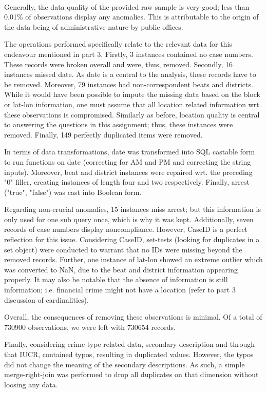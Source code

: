 \documentclass[a4paper]{article}
\begin{document}
\

Generally, the data quality of the provided  raw sample is very good; less than 0.01\% of observations display any anomalies. This is attributable to the origin of the data being of administrative nature by public offices.

\indent The operations performed specifically relate to the relevant data for this endeavour mentioned in part 3. Firstly, 3 instances contained no case numbers. These records were broken overall and were, thus, removed. Secondly, 16 instances missed date. As date is a central to the analysis, these records have to be removed. Moreover, 79 instances had non-correspondent beats and districts. While it would have been possible to impute the missing data based on the block or lat-lon information, one must assume that all location related information wrt. these observations is compromised. Similarly as before, location quality is central to answering the questions in this assignment; thus, these instances were removed. Finally, 149 perfectly duplicated items were removed. 

\indent In terms of data transformations, date was transformed into SQL castable form to run functions on date (correcting for AM and PM and correcting the string inputs). Moreover, beat and district instances were repaired wrt. the preceding "0" filler, creating instances of length four and two respectively. Finally, arrest ("true", "false") was cast into Boolean form. 

\indent Regarding non-crucial anomalies, 15 instances miss arrest; but this information is only used for one sub query once, which is why it was kept. Additionally, seven records of case numbers display noncompliance. However, CaseID is a perfect reflection for this issue. Considering CaseID, set-tests (looking for duplicates in a set object) were conducted to warrant that no IDs were missing beyond the removed records. Further, one instance of lat-lon showed an extreme outlier which was converted to NaN, due to the beat and district information appearing properly. It may also be notable that the absence of information is still information; i.e. financial crime might not have a location (refer to part 3 discussion of cardinalities). 

Overall, the consequences of removing these observations is minimal. Of a total of 730900 observations, we were left with 730654 records. 

Finally, considering crime type related data, secondary description and through that IUCR, contained typos, resulting in duplicated values. However, the typos did not change the meaning of the secondary descriptions. As such, a simple merge-right-join was performed to drop all duplicates on that dimension without loosing any data.
\end{document}
